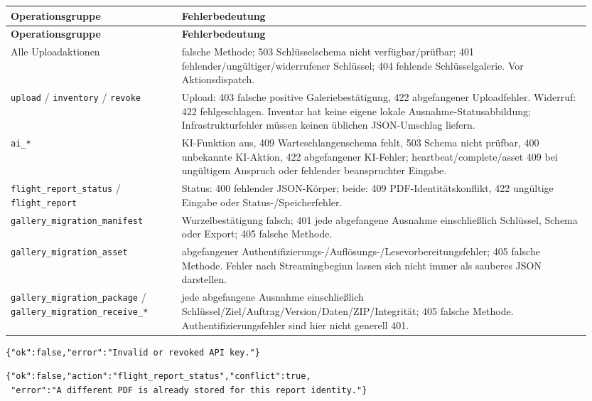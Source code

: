 \documentclass[11pt,a4paper]{article}
\newcommand{\codeword}[1]{\nolinkurl{#1}}
\begin{document}
\begin{longtable}{@{}>{\RaggedRight\arraybackslash}p{0.28\linewidth}>{\RaggedRight\arraybackslash}p{0.67\linewidth}@{}}
\toprule
\textbf{Operationsgruppe} & \textbf{Fehlerbedeutung} \\
\midrule
\endfirsthead
\toprule
\textbf{Operationsgruppe} & \textbf{Fehlerbedeutung} \\
\midrule
\endhead
\bottomrule
\endfoot
Alle Uploadaktionen & 405 falsche Methode; 503 Schlüsselschema nicht verfügbar/prüfbar; 401
fehlender/ungültiger/widerrufener Schlüssel; 404 fehlende Schlüsselgalerie. Vor
Aktionsdispatch. \\
\codeword{upload} / \codeword{inventory} / \codeword{revoke} & Upload: 403 falsche positive
Galeriebestätigung, 422 abgefangener Uploadfehler. Widerruf: 422 fehlgeschlagen. Inventar
hat keine eigene lokale Ausnahme-Statusabbildung; Infrastrukturfehler müssen keinen üblichen
JSON-Umschlag liefern. \\
\codeword{ai_*} & 403 KI-Funktion aus, 409 Warteschlangenschema fehlt, 503 Schema nicht
prüfbar, 400 unbekannte KI-Aktion, 422 abgefangener KI-Fehler; heartbeat/complete/asset 409
bei ungültigem Anspruch oder fehlender beanspruchter Eingabe. \\
\codeword{flight_report_status} / \codeword{flight_report} & Status: 400 fehlender
JSON-Körper; beide: 409 PDF-Identitätskonflikt, 422 ungültige Eingabe oder
Status-/Speicherfehler. \\
\codeword{gallery_migration_manifest} & 403 Wurzelbestätigung falsch; 401 jede abgefangene
Ausnahme einschließlich Schlüssel, Schema oder Export; 405 falsche Methode. \\
\codeword{gallery_migration_asset} & 404 abgefangener
Authentifizierungs-/Auflösungs-/Lesevorbereitungsfehler; 405 falsche Methode. Fehler nach
Streamingbeginn lassen sich nicht immer als sauberes JSON darstellen. \\
\codeword{gallery_migration_package} / \codeword{gallery_migration_receive_*} & 422 jede
abgefangene Ausnahme einschließlich Schlüssel/Ziel/Auftrag/Version/Daten/ZIP/Integrität; 405
falsche Methode. Authentifizierungsfehler sind hier nicht generell 401. \\
\end{longtable}

\begin{lstlisting}[language={}]
{"ok":false,"error":"Invalid or revoked API key."}
\end{lstlisting}

\begin{lstlisting}[language={}]
{"ok":false,"action":"flight_report_status","conflict":true,
 "error":"A different PDF is already stored for this report identity."}
\end{lstlisting}
\end{document}
